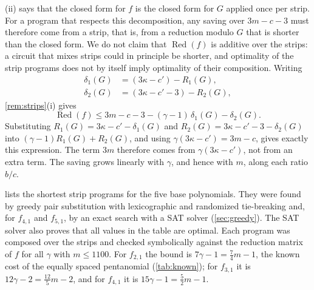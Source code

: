 \documentclass{ieeeaccess}
\theoremstyle{plain}
\theoremstyle{definition}
\newcommand{\Red}{\operatorname{Red}}
\begin{document}
(ii) says that the closed form for $f$ is the closed form for
$G$ applied once per strip. For a program that respects this decomposition, any
saving over $3m-c-3$ must therefore come from a strip, that is, from a reduction
modulo $G$ that is shorter than the closed form. We do not claim that
$\Red(f)$ is additive over the strips: a circuit that mixes strips could in
principle be shorter, and optimality of the strip programs does not by itself
imply optimality of their composition. Writing
\begin{align*}
  \delta_1(G)&=(3\kappa-c')-R_1(G),\\
  \delta_2(G)&=(3\kappa-c'-3)-R_2(G),
\end{align*}
\cref{rem:strips}(i) gives
\begin{equation}\label{eq:specialbound}
  \Red(f)\le 3m-c-3-(\gamma-1)\,\delta_1(G)-\delta_2(G).
\end{equation}
Substituting $R_1(G)=3\kappa-c'-\delta_1(G)$ and $R_2(G)=3\kappa-c'-3-\delta_2(G)$ into
$(\gamma-1)R_1(G)+R_2(G)$, and using $\gamma(3\kappa-c')=3m-c$, gives exactly this
expression. The term $3m$ therefore comes from $\gamma(3\kappa-c')$, not from an extra term.
The saving grows linearly with $\gamma$, and hence with $m$, along each ratio
$b/c$.

 lists the shortest strip programs for the five base
polynomials. They were found by greedy pair substitution with lexicographic and
randomized tie-breaking and, for $f_{4,1}$ and $f_{5,1}$, by an exact search with
a SAT solver (\cref{sec:greedy}). The SAT solver also proves that all values in
the table are optimal. Each program was composed over the strips and checked
symbolically against the reduction matrix of $f$ for all $\gamma$ with
$m\le1100$. For $f_{2,1}$ the bound is $7\gamma-1=\tfrac74m-1$, the known cost
of the equally spaced pentanomial (\cref{tab:known}); for $f_{3,1}$ it is
$12\gamma-2=\tfrac{12}5m-2$, and for $f_{4,1}$ it is $15\gamma-1=\tfrac52m-1$.
\end{document}
